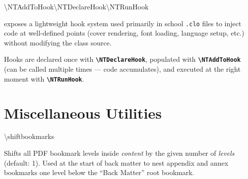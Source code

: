 \begin{macrodoc}{\textbackslash NTAddToHook\quad\textbackslash NTDeclareHook\quad\textbackslash NTRunHook}

\novathesis{} exposes a lightweight hook system used primarily in
school \texttt{.clo} files to inject code at well-defined points
(cover rendering, font loading, language setup, etc.) without
modifying the class source.

Hooks are declared once with \textbf{\texttt{\textbackslash NTDeclareHook}},
populated with \textbf{\texttt{\textbackslash NTAddToHook}} (can be
called multiple times — code accumulates), and executed at the right
moment with \textbf{\texttt{\textbackslash NTRunHook}}.

\begin{latexcode}
\end{latexcode}
\end{macrodoc}

\section{Miscellaneous Utilities}
\label{sec:int_misc}

\begin{macrodoc}{\textbackslash shiftbookmarks}

Shifts all \gls{PDF} bookmark levels inside \emph{content} by the given
number of \emph{levels} (default: 1).  Used at the start of back
matter to nest appendix and annex bookmarks one level below the
``Back Matter'' root bookmark.

\begin{latexcode}
\shiftbookmarks[1]{\ntprintbibsingle \ntprintappendices \ntprintannexes}
\end{latexcode}
\end{macrodoc}

